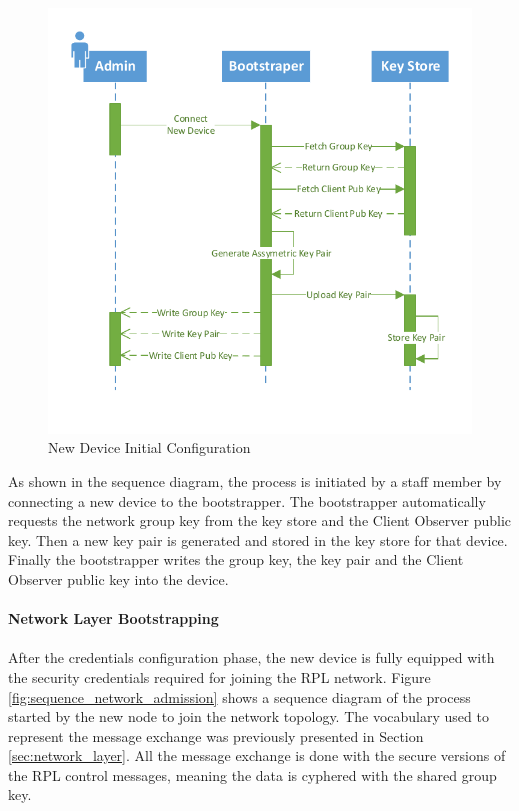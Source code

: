 \begin{figure}[h]
  \centering
  \includegraphics[width=0.8\linewidth]{figures/Sequence_Bootstrapping.pdf}
  \caption{New Device Initial Configuration}
  \label{fig:sequence_bootstrapping}
\end{figure}

As shown in the sequence diagram, the process is initiated by a staff member by connecting a new device to the bootstrapper. The bootstrapper automatically requests the network group key from the key store and the Client Observer public key. Then a new key pair is generated and stored in the key store for that device. Finally the bootstrapper writes the group key, the key pair and the Client Observer public key into the device.
\pagebreak
\paragraph{\textbf{Network Layer Bootstrapping}}
\paragraph{}

After the credentials configuration phase, the new device is fully equipped with the security credentials required for joining the RPL network. Figure \ref{fig:sequence_network_admission} shows a sequence diagram of the process started by the new node to join the network topology. The vocabulary used to represent the message exchange was previously presented in Section \ref{sec:network_layer}. All the message exchange is done with the secure versions of the RPL control messages, meaning the data is cyphered with the shared group key.

